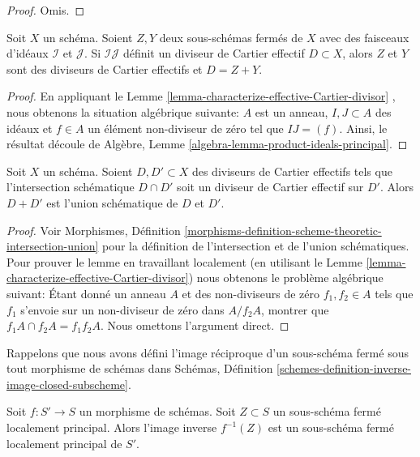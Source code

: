 \begin{proof}
Omis.
\end{proof}

\begin{lemma}
\label{lemma-sum-closed-subschemes-effective-Cartier}
Soit  $X$  un schéma. Soient  $Z, Y$  deux sous-schémas fermés de
 $X$  avec des faisceaux d'idéaux  $\mathcal{I}$  et  $\mathcal{J}$. Si
 $\mathcal{I}\mathcal{J}$  définit un diviseur de Cartier effectif  $D \subset X$, alors
 $Z$  et  $Y$  sont des diviseurs de Cartier effectifs et
 $D = Z + Y$.
\end{lemma}

\begin{proof}
En appliquant le Lemme  \ref{lemma-characterize-effective-Cartier-divisor} , nous obtenons la situation algébrique
suivante:  $A$  est un anneau,  $I, J \subset A$  des idéaux et  $f \in A$  un
élément non-diviseur de zéro tel que  $IJ = (f)$. Ainsi, le résultat découle de
Algèbre, Lemme  \ref{algebra-lemma-product-ideals-principal}.
\end{proof}

\begin{lemma}
\label{lemma-sum-effective-Cartier-divisors-union}
Soit  $X$  un schéma. Soient  $D, D' \subset X$  des diviseurs de Cartier
effectifs tels que l'intersection schématique  $D \cap D'$  soit un diviseur de
Cartier effectif sur  $D'$. Alors  $D + D'$  est l'union schématique de
 $D$  et  $D'$.
\end{lemma}

\begin{proof}
Voir Morphismes, Définition  \ref{morphisms-definition-scheme-theoretic-intersection-union}  pour la définition de l'intersection et
de l'union schématiques. Pour prouver le lemme en travaillant localement (en
utilisant le Lemme  \ref{lemma-characterize-effective-Cartier-divisor}) nous obtenons le problème algébrique suivant:
Étant donné un anneau  $A$  et des non-diviseurs de zéro  $f_1, f_2 \in A$  tels
que  $f_1$  s'envoie sur un non-diviseur de zéro dans  $A/f_2A$, montrer
que  $f_1A \cap f_2A = f_1f_2A$. Nous omettons l'argument direct.
\end{proof}

\noindent
Rappelons que nous avons défini l'image réciproque d'un sous-schéma fermé sous
tout morphisme de schémas dans Schémas, Définition  \ref{schemes-definition-inverse-image-closed-subscheme}.

\begin{lemma}
\label{lemma-pullback-locally-principal}
Soit  $f : S' \to S$  un morphisme de schémas. Soit  $Z \subset S$  un sous-schéma fermé
localement principal. Alors l'image inverse  $f^{-1}(Z)$  est un sous-schéma fermé
localement principal de  $S'$.
\end{lemma}

